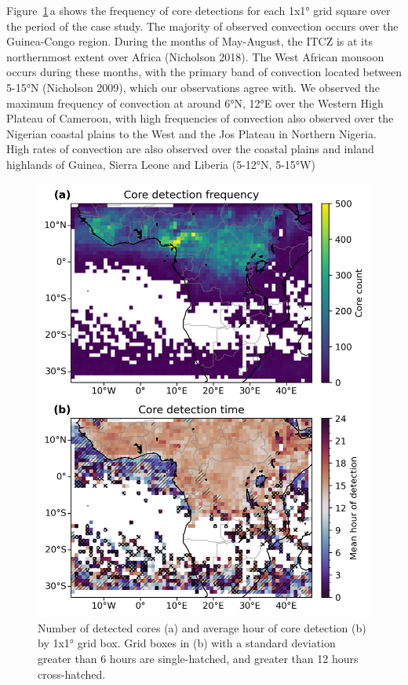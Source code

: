 Figure~\ref{fig:seviri_map_dists}\,a shows the frequency of core detections for each 1x1° grid
square over the period of the case study. The majority of observed
convection occurs over the Guinea-Congo region. During the months of
May-August, the ITCZ is at its northernmost extent over Africa
(Nicholson 2018). The West African monsoon occurs during these
months, with the primary band of convection located between 5-15°N
(Nicholson 2009), which our observations agree with. We observed the
maximum frequency of convection at around 6°N, 12°E over the Western
High Plateau of Cameroon, with high frequencies of convection also
observed over the Nigerian coastal plains to the West and the Jos
Plateau in Northern Nigeria. High rates of convection are also observed
over the coastal plains and inland highlands of Guinea, Sierra Leone and
Liberia (5-12°N, 5-15°W)


\begin{figure}[tp]
    \includegraphics[width=\textwidth]{figures/ch3_05.png}
    \caption[
    Number of detected cores and average hour of core detection
    ]{
    Number of detected cores (a) and average hour of core detection (b) by 1x1° grid box. Grid boxes in (b) with a standard deviation greater than 6 hours are single-hatched, and greater than 12 hours cross-hatched.
    }
    \label{fig:seviri_map_dists}
\end{figure}


